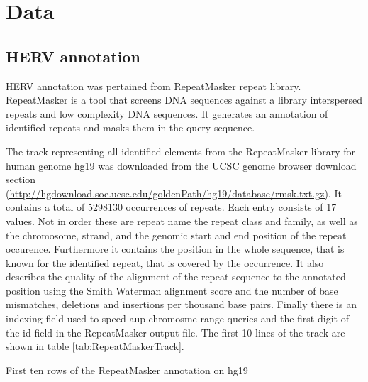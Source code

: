 \documentclass[a4paper,12pt]{article}
\begin{document}
\newpage
\section{Data}


\subsection{HERV annotation}
HERV annotation was pertained from RepeatMasker\cite{RepeatMasker} repeat library. RepeatMasker is a tool that screens DNA sequences against a library interspersed repeats and low complexity DNA sequences. It generates an annotation of identified repeats and masks them in the query sequence.

The track representing all identified elements from the RepeatMasker library for human genome hg19 was downloaded from the UCSC genome browser download section \url{(http://hgdownload.soe.ucsc.edu/goldenPath/hg19/database/rmsk.txt.gz)}. It contains a total of 5298130 occurrences of repeats. Each entry consists of 17 values. Not in order these are repeat name the repeat class and family, as well as the chromosome, strand, and the genomic start and end position of the repeat occurence. Furthermore it contains the position in the whole sequence, that is known for the identified repeat, that is covered by the occurrence. It also describes the quality of the alignment of the repeat sequence to the annotated position using the Smith Waterman alignment score\cite{SMITH1981195} and the number of base mismatches, deletions and insertions per thousand base pairs. Finally there is an indexing field used to speed aup chromosme range queries and the first digit of the id field in the RepeatMasker output file. The first 10 lines of the track are shown in table \ref{tab:RepeatMaskerTrack}.

\begin{table}[b]
\centering
\label{tab:RepeatMaskerTrack}
\caption{First ten rows of the RepeatMasker annotation on hg19}
\end{table}
\end{document}
